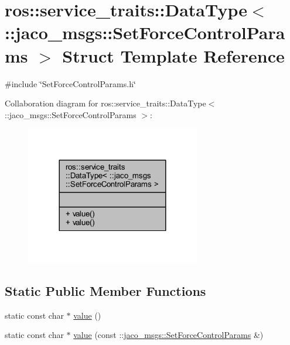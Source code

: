 \hypertarget{structros_1_1service__traits_1_1DataType_3_01_1_1jaco__msgs_1_1SetForceControlParams_01_4}{}\section{ros\+:\+:service\+\_\+traits\+:\+:Data\+Type$<$ \+:\+:jaco\+\_\+msgs\+:\+:Set\+Force\+Control\+Params $>$ Struct Template Reference}
\label{structros_1_1service__traits_1_1DataType_3_01_1_1jaco__msgs_1_1SetForceControlParams_01_4}


{\ttfamily \#include \char`\"{}Set\+Force\+Control\+Params.\+h\char`\"{}}



Collaboration diagram for ros\+:\+:service\+\_\+traits\+:\+:Data\+Type$<$ \+:\+:jaco\+\_\+msgs\+:\+:Set\+Force\+Control\+Params $>$\+:
\nopagebreak
\begin{figure}[H]
\begin{center}
\leavevmode
\includegraphics[width=216pt]{dd/dd8/structros_1_1service__traits_1_1DataType_3_01_1_1jaco__msgs_1_1SetForceControlParams_01_4__coll__graph}
\end{center}
\end{figure}
\subsection*{Static Public Member Functions}
\begin{DoxyCompactItemize}
\item 
static const char $\ast$ \hyperlink{structros_1_1service__traits_1_1DataType_3_01_1_1jaco__msgs_1_1SetForceControlParams_01_4_a067f75745986762d494bcedbae0214a9}{value} ()
\item 
static const char $\ast$ \hyperlink{structros_1_1service__traits_1_1DataType_3_01_1_1jaco__msgs_1_1SetForceControlParams_01_4_a93009590e387994ad77d296c8494d162}{value} (const \+::\hyperlink{namespacejaco__msgs_df/d4f/structjaco__msgs_1_1SetForceControlParams}{jaco\+\_\+msgs\+::\+Set\+Force\+Control\+Params} \&)
\end{DoxyCompactItemize}



